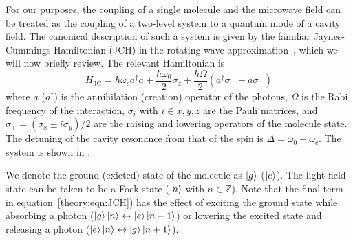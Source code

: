 For our purposes, the coupling of a single molecule and the microwave field can
be treated as the coupling of a two-level system to a quantum mode of a cavity
field. The canonical description of such a system is given by the familiar
Jaynes-Cummings Hamiltonian (JCH) in the rotating wave
approximation~\cite{gerry_knight_2004}, which we will now briefly review. The
relevant Hamiltonian is
%
\begin{equation}
  H_\text{JC} = \hbar\omega_c a^\dagger a + \frac{\hbar \omega_0}{2} \sigma_z +
  \frac{\hbar\Omega}{2}(a^\dagger \sigma_- + a\sigma_+)
  \label{theory:eqn:JCH}
\end{equation}
%
where $a$ ($a^\dagger$) is the annihilation (creation) operator of the photons,
$\Omega$ is the Rabi frequency of the interaction, $\sigma_i$ with $i\in{x, y,
z}$ are the Pauli matrices, and $\sigma_\pm = (\sigma_x \pm i\sigma_y)/2$ are
the raising and lowering operators of the molecule state. The detuning of the
cavity resonance from that of the spin is $\Delta = \omega_0 - \omega_c$. The
system is shown in .

\begin{figure}
  \caption{}
  \label{theory:fig:JCHstates}
\end{figure}

We denote the ground (exicted) state of the molecule as $\ket{g}$ ($\ket{e}$).
The light field state can be taken to be a Fock state ($\ket{n}$ with $n \in
\mathbb{Z}$). Note that the final term in equation~\ref{theory:eqn:JCH}) has
the effect of exciting the ground state while absorbing a photon
($\ket{g}\ket{n} \leftrightarrow \ket{e}\ket{n-1}$) or lowering the excited state
and releasing a photon ($\ket{e}\ket{n} \leftrightarrow \ket{g}\ket{n+1}$).


